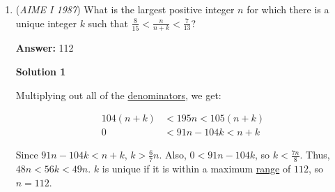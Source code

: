 \begin{enumerate}
 



\textbf{Solution 2}

$1000 = 2^35^3$ and $2000 = 2^45^3$. By \href{https://artofproblemsolving.com/wiki/index.php?title=LCM\#Using\_prime\_factorization}{looking at the prime factorization} of $2000$, $c$ must have a \href{https://artofproblemsolving.com/wiki/index.php?title=Factor}{factor} of $2^4$. If $c$ has a factor of $5^3$, then there are two \href{https://artofproblemsolving.com/wiki/index.php?title=Casework}{cases}: either (1) $a$ or $b = 5^32^3$, or (2) one of $a$ and $b$ has a factor of $5^3$ and the other a factor of $2^3$. For case 1, the other number will be in the form of $2^x5^y$, so there are $4 \cdot 4 = 16$ possible such numbers; since this can be either $a$ or $b$ there are a total of $2(16)-1=31$ possibilities. For case 2, $a$ and $b$ are in the form of $2^35^x$ and $2^y5^3$, with $x < 3$ and $y < 3$ (if they were equal to 3, it would overlap with case 1). Thus, there are $2(3 \cdot 3) = 18$ cases.

 If $c$ does not have a factor of $5^3$, then at least one of $a$ and $b$ must be $2^35^3$, and both must have a factor of $5^3$. Then, there are $4$ solutions possible just considering $a = 2^35^3$, and a total of $4 \cdot 2 - 1 = 7$ possibilities. Multiplying by three, as $0 \le c \le 2$, there are $7 \cdot 3 = 21$. Together, that makes $31 + 18 + 21 = 70$ solutions for $(a, b, c)$.

 


	\item (\textit{AIME I 1987}) What is the largest positive integer $n$ for which there is a unique integer $k$ such that $\frac{8}{15} < \frac{n}{n + k} < \frac{7}{13}$?


 
 \textbf{Answer: }112



\textbf{Solution 1}

Multiplying out all of the \href{https://artofproblemsolving.com/wiki/index.php?title=Denominator}{denominators}, we get:

 
 \begin{align*}104(n+k) &< 195n< 105(n+k)\\ 0 &< 91n - 104k < n + k\end{align*}


 Since $91n - 104k < n + k$, $k > \frac{6}{7}n$. Also, $0 < 91n - 104k$, so $k < \frac{7n}{8}$. Thus, $48n < 56k < 49n$. $k$ is unique if it is within a maximum \href{https://artofproblemsolving.com/wiki/index.php?title=Range}{range} of $112$, so $n = \boxed{112}$.


\end{enumerate}
